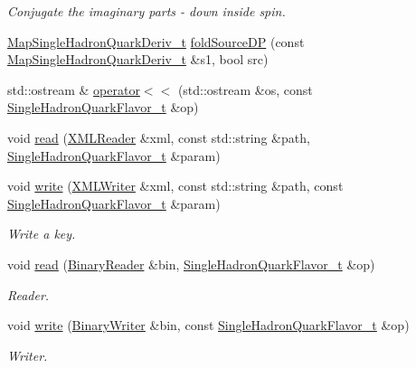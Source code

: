\begin{DoxyCompactItemize}
\begin{DoxyCompactList}\small\item\em Conjugate the imaginary parts -\/ down inside spin. \end{DoxyCompactList}\item 
\mbox{\hyperlink{namespaceHadron_aa588220689caea8a6aad4d0296526e6b}{Map\+Single\+Hadron\+Quark\+Deriv\+\_\+t}} \mbox{\hyperlink{namespaceHadron_af80d375e34002f168b53c74370f8dd3a}{fold\+Source\+DP}} (const \mbox{\hyperlink{namespaceHadron_aa588220689caea8a6aad4d0296526e6b}{Map\+Single\+Hadron\+Quark\+Deriv\+\_\+t}} \&s1, bool src)
\item 
std\+::ostream \& \mbox{\hyperlink{namespaceHadron_a7b979b64d9a0ab8025031a090f9494c0}{operator$<$$<$}} (std\+::ostream \&os, const \mbox{\hyperlink{structHadron_1_1SingleHadronQuarkFlavor__t}{Single\+Hadron\+Quark\+Flavor\+\_\+t}} \&op)
\item 
void \mbox{\hyperlink{namespaceHadron_af2bd5c5dd10efe01fefda4ec1c5ce04d}{read}} (\mbox{\hyperlink{classADATXML_1_1XMLReader}{X\+M\+L\+Reader}} \&xml, const std\+::string \&path, \mbox{\hyperlink{structHadron_1_1SingleHadronQuarkFlavor__t}{Single\+Hadron\+Quark\+Flavor\+\_\+t}} \&param)
\item 
void \mbox{\hyperlink{namespaceHadron_aa1f03b8b2d78349da848f9a9bcf19e33}{write}} (\mbox{\hyperlink{classADATXML_1_1XMLWriter}{X\+M\+L\+Writer}} \&xml, const std\+::string \&path, const \mbox{\hyperlink{structHadron_1_1SingleHadronQuarkFlavor__t}{Single\+Hadron\+Quark\+Flavor\+\_\+t}} \&param)
\begin{DoxyCompactList}\small\item\em Write a key. \end{DoxyCompactList}\item 
void \mbox{\hyperlink{namespaceHadron_ae80a1bcfb7767fb7993d4a439d6493ba}{read}} (\mbox{\hyperlink{classADATIO_1_1BinaryReader}{Binary\+Reader}} \&bin, \mbox{\hyperlink{structHadron_1_1SingleHadronQuarkFlavor__t}{Single\+Hadron\+Quark\+Flavor\+\_\+t}} \&op)
\begin{DoxyCompactList}\small\item\em Reader. \end{DoxyCompactList}\item 
void \mbox{\hyperlink{namespaceHadron_a2994f8fc2ad609574b948b8671232dd8}{write}} (\mbox{\hyperlink{classADATIO_1_1BinaryWriter}{Binary\+Writer}} \&bin, const \mbox{\hyperlink{structHadron_1_1SingleHadronQuarkFlavor__t}{Single\+Hadron\+Quark\+Flavor\+\_\+t}} \&op)
\begin{DoxyCompactList}\small\item\em Writer. \end{DoxyCompactList}\item 

\end{DoxyCompactItemize}
